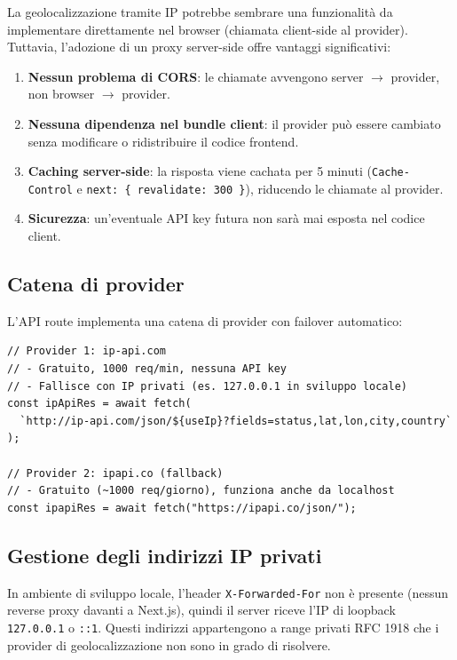\documentclass[12pt, a4paper]{article}
\begin{document}
La geolocalizzazione tramite IP potrebbe sembrare una funzionalità da
implementare direttamente nel browser (chiamata client-side al provider).
Tuttavia, l'adozione di un proxy server-side offre vantaggi significativi:

\begin{enumerate}[leftmargin=1.5em]
  \item \textbf{Nessun problema di CORS}: le chiamate avvengono
    server $\rightarrow$ provider, non browser $\rightarrow$ provider.
  \item \textbf{Nessuna dipendenza nel bundle client}: il provider può essere
    cambiato senza modificare o ridistribuire il codice frontend.
  \item \textbf{Caching server-side}: la risposta viene cachata per 5 minuti
    (\texttt{Cache-Control} e \texttt{next: \{ revalidate: 300 \}}), riducendo
    le chiamate al provider.
  \item \textbf{Sicurezza}: un'eventuale API key futura non sarà mai esposta
    nel codice client.
\end{enumerate}

\subsection{Catena di provider}

L'API route implementa una catena di provider con failover automatico:

\begin{lstlisting}[caption={Catena di provider in \texttt{/api/geo}}]
// Provider 1: ip-api.com
// - Gratuito, 1000 req/min, nessuna API key
// - Fallisce con IP privati (es. 127.0.0.1 in sviluppo locale)
const ipApiRes = await fetch(
  `http://ip-api.com/json/${useIp}?fields=status,lat,lon,city,country`
);

// Provider 2: ipapi.co (fallback)
// - Gratuito (~1000 req/giorno), funziona anche da localhost
const ipapiRes = await fetch("https://ipapi.co/json/");
\end{lstlisting}

\subsection{Gestione degli indirizzi IP privati}

In ambiente di sviluppo locale, l'header \texttt{X-Forwarded-For} non è
presente (nessun reverse proxy davanti a Next.js), quindi il server riceve
l'IP di loopback \texttt{127.0.0.1} o \texttt{::1}. Questi indirizzi
appartengono a range privati RFC 1918 \cite{rfc1918} che i provider di
geolocalizzazione non sono in grado di risolvere.
\end{document}
